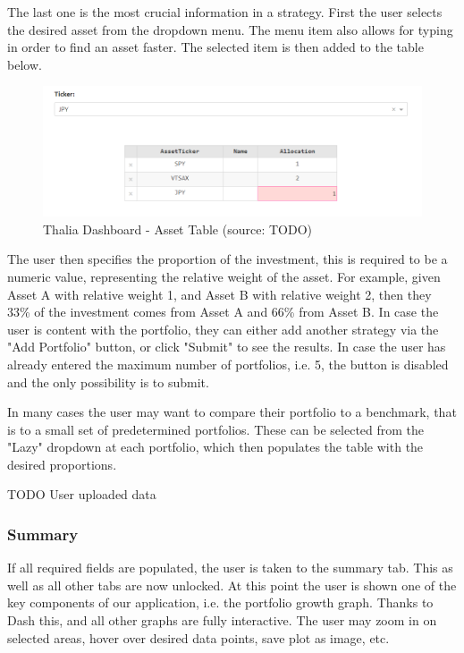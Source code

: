 \documentclass[main.tex]{subfiles}
\begin{document}
The last one is the most crucial information in a strategy. First the user selects the desired asset from the dropdown menu. The menu item also allows for typing in order to find an asset faster. The selected item is then added to the table below.

\begin{figure}[H]
   \centering
   \includegraphics[width=\textwidth]{08Appendices/081User/081Pictures/table.png}
   \caption{Thalia Dashboard - Asset Table (source: TODO)}
   \label{thalia_table}
\end{figure}

The user then specifies the proportion of the investment, this is required to be a numeric value, representing the relative weight of the asset. For example, given Asset A with relative weight 1, and Asset B with relative weight 2, then they 33\% of the investment comes from Asset A and 66\% from Asset B.
In case the user is content with the portfolio, they can either add another strategy via the "Add Portfolio" button, or click "Submit" to see the results. In case the user has already entered the maximum number of portfolios, i.e. 5, the button is disabled and the only possibility is to submit.

In many cases the user may want to compare their portfolio to a benchmark, that is to a small set of predetermined portfolios. These can be selected from the "Lazy" dropdown at each portfolio, which then populates the table with the desired proportions.

TODO User uploaded data

\subsubsection*{Summary}

If all required fields are populated, the user is taken to the summary tab. This as well as all other tabs are now unlocked. At this point the user is shown one of the key components of our application, i.e. the portfolio growth graph. Thanks to Dash this, and all other graphs are fully interactive. The user may zoom in on selected areas, hover over desired data points, save plot as image, etc.
\end{document}
